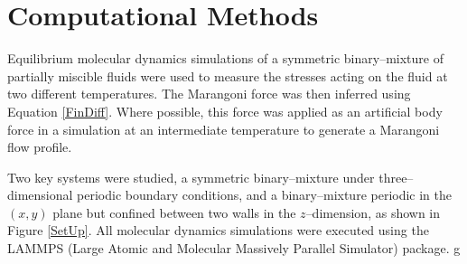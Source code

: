 \section{Computational Methods}

Equilibrium molecular dynamics simulations of a symmetric binary--mixture of partially miscible fluids were used to measure the stresses acting on the fluid at two different temperatures.
The Marangoni force was then inferred using Equation \ref{FinDiff}.
Where possible, this force was applied as an artificial body force in a simulation at an intermediate temperature to generate a Marangoni flow profile.

Two key systems were studied, a symmetric binary–mixture under three--dimensional periodic boundary conditions, and a binary--mixture periodic in the $(x,y)$ plane but confined between two walls in the $z$--dimension, as shown in Figure \ref{SetUp}.
All molecular dynamics simulations were executed using the LAMMPS (Large Atomic and Molecular Massively Parallel Simulator) package.\cite{LAMMPS}  
g
